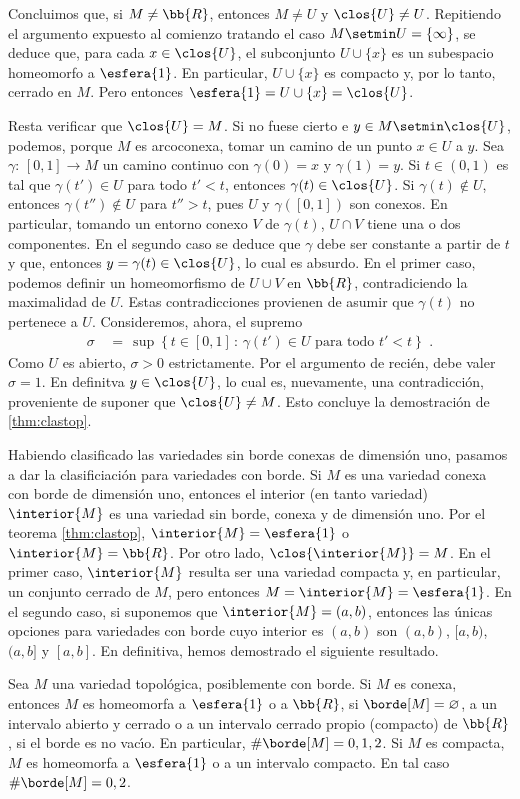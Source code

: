 Concluimos que, si $M\not =\bb{R}$, entonces $M\not =U$ y $\clos{U}\not =U$.
Repitiendo el argumento expuesto al comienzo tratando el caso
$M\setmin U=\{\infty\}$, se deduce que, para cada $x\in\clos{U}$, el
subconjunto $U\cup\{x\}$ es un subespacio homeomorfo a $\esfera{1}$.
En particular, $U\cup\{x\}$ es compacto y, por lo tanto, cerrado en $M$.
Pero entonces $\esfera{1}=U\cup\{x\}=\clos{U}$.

Resta verificar que $\clos{U}=M$. Si no fuese cierto e
$y\in M\setmin\clos{U}$, podemos, porque $M$ es arcoconexa, tomar un camino
de un punto $x\in U$ a $y$. Sea $\gamma:\,[0,1]\rightarrow M$ un camino
continuo con $\gamma(0)=x$ y $\gamma(1)=y$. Si $t\in (0,1)$ es tal que
$\gamma(t')\in U$ para todo $t'<t$, entonces $\gamma(t)\in\clos{U}$. Si
$\gamma(t)\not\in U$, entonces $\gamma(t'')\not\in U$ para $t''>t$, pues
$U$ y $\gamma([0,1])$ son conexos. En particular, tomando un entorno conexo
$V$ de $\gamma(t)$, $U\cap V$ tiene una o dos componentes. En el segundo
caso se deduce que $\gamma$ debe ser constante a partir de $t$ y que,
entonces $y=\gamma(t)\in\clos{U}$, lo cual es absurdo. En el primer caso,
podemos definir un homeomorfismo de $U\cup V$ en $\bb{R}$, contradiciendo
la maximalidad de $U$. Estas contradicciones provienen de asumir que
$\gamma(t)$ no pertenece a $U$. Consideremos, ahora, el supremo
\begin{align*}
	\sigma & \,=\,\sup\left\lbrace
		t\in[0,1]\,:\,\gamma(t')\in U\text{ para todo }t'<t
		\right\rbrace
	\text{ .}
\end{align*}
%
Como $U$ es abierto, $\sigma >0$ estrictamente. Por el argumento de
reci\'{e}n, debe valer $\sigma=1$. En definitva $y\in\clos{U}$,
lo cual es, nuevamente, una contradicci\'{o}n, proveniente de
suponer que $\clos{U}\not =M$. Esto concluye la demostraci\'{o}n de
\ref{thm:clastop}.

Habiendo clasificado las variedades sin borde conexas de dimensi\'{o}n uno,
pasamos a dar la clasificiaci\'{o}n para variedades con borde. Si $M$
es una variedad conexa con borde de dimensi\'{o}n uno, entonces
el interior (en tanto variedad) $\interior{M}$ es una variedad sin borde,
conexa y de dimensi\'{o}n uno. Por el teorema \ref{thm:clastop},
$\interior{M}=\esfera{1}$ o $\interior{M}=\bb{R}$. Por otro lado,
$\clos{\interior{M}}=M$. En el primer caso, $\interior{M}$ resulta ser una
variedad compacta y, en particular, un conjunto cerrado de $M$, pero
entonces $M=\interior{M}=\esfera{1}$. En el segundo caso, si suponemos que
$\interior{M}=(a,b)$, entonces las \'{u}nicas opciones para variedades
con borde cuyo interior es $(a,b)$ son $(a,b)$, $[a,b)$, $(a,b]$ y $[a,b]$.
En definitiva, hemos demostrado el siguiente resultado.

\begin{teoClasTopConBorde}\label{thm:clastopconborde}
	Sea $M$ una variedad topol\'{o}gica, posiblemente con borde. Si
	$M$ es conexa, entonces $M$ es homeomorfa a $\esfera{1}$ o a
	$\bb{R}$, si $\borde[M]=\varnothing$, a un intervalo abierto y
	cerrado o a un intervalo cerrado propio (compacto) de $\bb{R}$,
	si el borde es no vac\'{\i}o. En particular,
	$\#\borde[M]=0,1,2$. Si $M$ es compacta,
	$M$ es homeomorfa a $\esfera{1}$ o a un intervalo compacto. En
	tal caso $\#\borde[M]=0,2$.
\end{teoClasTopConBorde}
